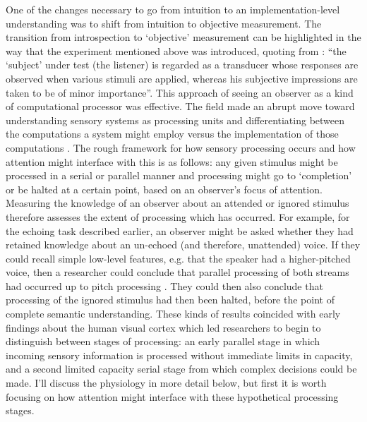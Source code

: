 One of the changes necessary to go from intuition to an implementation-level understanding was to shift from intuition to objective measurement. The transition from introspection to ‘objective’ measurement can be highlighted in the way that the experiment mentioned above was introduced, quoting from \citet{Cherry1953-as}: ``the `subject' under test (the listener) is regarded as a transducer whose responses are observed when various stimuli are applied, whereas his subjective impressions are taken to be of minor importance''. This approach of seeing an observer as a kind of computational processor was effective. The field made an abrupt move toward understanding sensory systems as processing units and differentiating between the computations a system might employ versus the implementation of those computations \citep{Marr1982-fg}. The rough framework for how sensory processing occurs and how attention might interface with this is as follows: any given stimulus might be processed in a serial or parallel manner and processing might go to `completion' or be halted at a certain point, based on an observer's focus of attention. Measuring the knowledge of an observer about an attended or ignored stimulus therefore assesses the extent of processing which has occurred. For example, for the echoing task described earlier, an observer might be asked whether they had retained knowledge about an un-echoed (and therefore, unattended) voice. If they could recall simple low-level features, e.g. that the speaker had a higher-pitched voice, then a researcher could conclude that parallel processing of both streams had occurred up to pitch processing \citep{Cherry1953-as}. They could then also conclude that processing of the ignored stimulus had then been halted, before the point of complete semantic understanding. These kinds of results coincided with early findings about the human visual cortex \citep{Kuffler1953-qw,Hubel1962-pn,Hubel1968-na} which led researchers to begin to distinguish between stages of processing: an early parallel stage in which incoming sensory information is processed without immediate limits in capacity, and a second limited capacity serial stage from which complex decisions could be made. I'll discuss the physiology in more detail below, but first it is worth focusing on how attention might interface with these hypothetical processing stages. 

